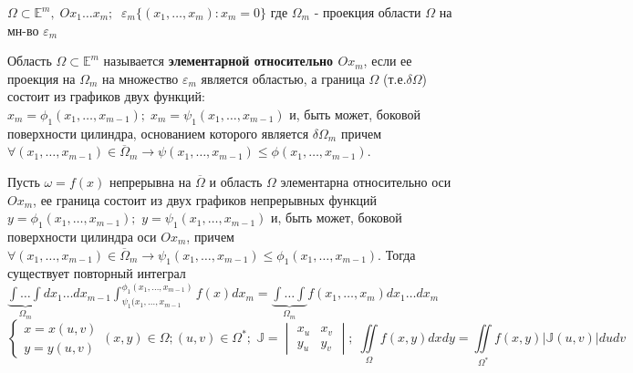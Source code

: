 	$\Omega \subset \mathbb{E}^m, \; Ox_1\dots x_m; \;\; \varepsilon_m \{(x_1,\dots, x_m): x_m=0\}$ где $\Omega_m $ - проекция области $\Omega$ на мн-во $\varepsilon_m$
\begin{determenition}
	Область $\Omega\subset \mathbb{E}^m$ называется \textbf{элементарной относительно $Ox_m$}, если ее проекция на $\Omega_m $ на множество $\varepsilon_m$ является областью, а  граница $\Omega$ (т.е.$ \delta\Omega$) состоит из графиков двух функций: $x_m=\phi_1(x_1,\dots, x_{m-1});\; x_m=\psi_1(x_1,\dots, x_{m-1}) $ и, быть может, боковой поверхности цилиндра, основанием которого является $\delta\Omega_m $ причем $\forall (x_1,\dots, x_{m-1})\in \overline{\Omega}_m \rightarrow  \psi(x_1,\dots, x_{m-1}) \leq \phi(x_1,\dots, x_{m-1}).$
	
\end{determenition}

\begin{theorem}
		Пусть $\omega=f(x)$ непрерывна на $\overline{\Omega} $ и область $\Omega$ элементарна относительно оси $Ox_m$, ее граница состоит из двух графиков непрерывных функций $y=\phi_1(x_1,\dots, x_{m-1});$ 
		$ y=\psi_1(x_1,\dots, x_{m-1}) $ и, быть может, боковой поверхности цилиндра оси $Ox_m $,  причем $\forall (x_1,\dots, x_{m-1})\in \overline{\Omega}_m \rightarrow  \psi_1(x_1,\dots, x_{m-1}) \leq \phi_1(x_1,\dots, x_{m-1}).$
	 	Тогда существует повторный интеграл $\underbrace{\int\dots\int}_{\Omega_m} dx_1\dots dx_{m-1} \int_{\psi_1(x_1,\dots, x_{m-1}}^{\phi_1(x_1,\dots, x_{m-1})} f(x) dx_m = \underbrace{\int\dots\int}_{\Omega_m} f(x_1, \dots, x_m)dx_1\dots dx_{m} $\\
	 	$$ \begin{cases}
	 	x=x(u,v) \\ y=y(u,v)
	 	\end{cases} 
	 	(x,y)\in\Omega; (u,v)\in\Omega^*; \; 
	 	\mathbb{J}= 
	 	\begin{vmatrix}
	 		x_u& x_v\\
	 		y_u& y_v
	 	\end{vmatrix};\;\iint\limits_\Omega f(x,y) dxdy=\iint\limits_{\Omega^*}f(x, y) | \mathbb{J}(u,v) | dudv $$
\end{theorem}

